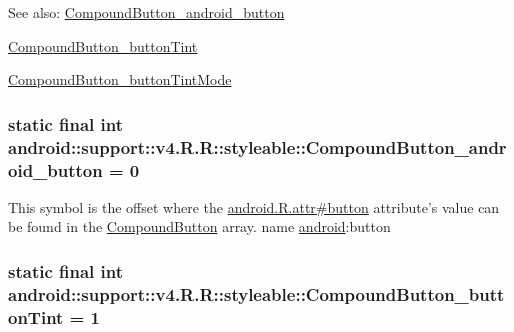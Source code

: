\begin{Desc}
\item[See also:]\hyperlink{classandroid_1_1support_1_1v4_1_1_r_1_1styleable_af18b699c10e7dee1620c5afb1bcde5a}{CompoundButton\_\-android\_\-button} 

\hyperlink{classandroid_1_1support_1_1v4_1_1_r_1_1styleable_cb33184620c870325a8b7e37e0b99eca}{CompoundButton\_\-buttonTint} 

\hyperlink{classandroid_1_1support_1_1v4_1_1_r_1_1styleable_47f68c1e5646a0561d3c3e5ba109c9f3}{CompoundButton\_\-buttonTintMode} \end{Desc}
\hypertarget{classandroid_1_1support_1_1v4_1_1_r_1_1styleable_af18b699c10e7dee1620c5afb1bcde5a}{
\subsubsection[{CompoundButton\_\-android\_\-button}]{\setlength{\rightskip}{0pt plus 5cm}static final int android::support::v4.R.R::styleable::CompoundButton\_\-android\_\-button = 0}}
\label{classandroid_1_1support_1_1v4_1_1_r_1_1styleable_af18b699c10e7dee1620c5afb1bcde5a}


This symbol is the offset where the \hyperlink{}{android.R.attr\#button} attribute's value can be found in the \hyperlink{classandroid_1_1support_1_1v4_1_1_r_1_1styleable_0f66eed6935e1b8ebc6b74c5e0089183}{CompoundButton} array.  name \hyperlink{namespaceandroid}{android}:button \hypertarget{classandroid_1_1support_1_1v4_1_1_r_1_1styleable_cb33184620c870325a8b7e37e0b99eca}{
\subsubsection[{CompoundButton\_\-buttonTint}]{\setlength{\rightskip}{0pt plus 5cm}static final int android::support::v4.R.R::styleable::CompoundButton\_\-buttonTint = 1}}
\label{classandroid_1_1support_1_1v4_1_1_r_1_1styleable_cb33184620c870325a8b7e37e0b99eca}



